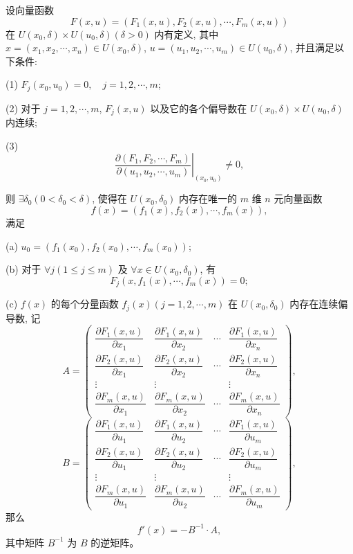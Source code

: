 \documentclass[UTF8,12pt,a4paper,fontset=fandol]{ctexart}
\begin{document}
\begin{theorem}[隐函数组存在定理]\label{course-theorem-14-4-3}\quad 设向量函数
\[
  F(x,u)=(F_1(x,u),F_2(x,u),\cdots,F_m(x,u))
\]
在 $U(x_0,\delta)\times U(u_0,\delta)(\delta>0)$ 内有定义, 其中 $x=(x_1,x_2,\cdots,x_n)\in U(x_0,\delta)$, $u=(u_1,u_2,\cdots,u_m)\in U(u_0,\delta)$, 并且满足以下条件:

(1) $F_j(x_0,u_0)=0,\quad j=1,2,\cdots,m$;

(2) 对于 $j=1,2,\cdots,m$, $F_j(x,u)$ 以及它的各个偏导数在 $U(x_0,\delta)\times U(u_0,\delta)$ 内连续;

(3)
\[
  \left.
  \frac{\partial(F_1,F_2,\cdots,F_m)}
  {\partial(u_1,u_2,\cdots,u_m)}
  \right|_{(x_0,u_0)}
  \ne0,
\]

则 $\exists\delta_0(0<\delta_0<\delta)$, 使得在 $U(x_0,\delta_0)$ 内存在唯一的 $m$ 维 $n$ 元向量函数
\[
  f(x)=(f_1(x),f_2(x),\cdots,f_m(x)),
\]
满足

(a) $u_0=(f_1(x_0),f_2(x_0),\cdots,f_m(x_0))$;

(b) 对于 $\forall j(1\leqslant j\leqslant m)$ 及 $\forall x\in U(x_0,\delta_0)$, 有
\[
  F_j(x,f_1(x),\cdots,f_m(x))=0;
\]

(c) $f(x)$ 的每个分量函数 $f_j(x)(j=1,2,\cdots,m)$ 在 $U(x_0,\delta_0)$ 内存在连续偏导数, 记
\[
  A=
  \begin{pmatrix}
    \dfrac{\partial F_1(x,u)}{\partial x_1} &
    \dfrac{\partial F_1(x,u)}{\partial x_2} &
    \cdots &
    \dfrac{\partial F_1(x,u)}{\partial x_n}\\
    \dfrac{\partial F_2(x,u)}{\partial x_1} &
    \dfrac{\partial F_2(x,u)}{\partial x_2} &
    \cdots &
    \dfrac{\partial F_2(x,u)}{\partial x_n}\\
    \vdots & \vdots & & \vdots\\
    \dfrac{\partial F_m(x,u)}{\partial x_1} &
    \dfrac{\partial F_m(x,u)}{\partial x_2} &
    \cdots &
    \dfrac{\partial F_m(x,u)}{\partial x_n}
  \end{pmatrix},
\]
\[
  B=
  \begin{pmatrix}
    \dfrac{\partial F_1(x,u)}{\partial u_1} &
    \dfrac{\partial F_1(x,u)}{\partial u_2} &
    \cdots &
    \dfrac{\partial F_1(x,u)}{\partial u_m}\\
    \dfrac{\partial F_2(x,u)}{\partial u_1} &
    \dfrac{\partial F_2(x,u)}{\partial u_2} &
    \cdots &
    \dfrac{\partial F_2(x,u)}{\partial u_m}\\
    \vdots & \vdots & & \vdots\\
    \dfrac{\partial F_m(x,u)}{\partial u_1} &
    \dfrac{\partial F_m(x,u)}{\partial u_2} &
    \cdots &
    \dfrac{\partial F_m(x,u)}{\partial u_m}
  \end{pmatrix},
\]
那么
\[
  f'(x)=-B^{-1}\cdot A,
\]
其中矩阵 $B^{-1}$ 为 $B$ 的逆矩阵。

\end{theorem}
\end{document}
